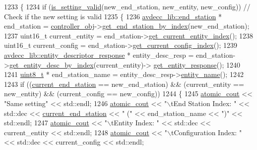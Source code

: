 \begin{DoxyCode}
1233 \{
1234     \textcolor{keywordflow}{if} (\hyperlink{classcmd__line_a52a88a9e3c1e1e6fea1865df944e3443}{is\_setting\_valid}(new\_end\_station, new\_entity, new\_config)) \textcolor{comment}{// Check if the new
       setting is valid}
1235     \{
1236         \hyperlink{classavdecc__lib_1_1end__station}{avdecc\_lib::end\_station} * end\_station = 
      \hyperlink{classcmd__line_af0a7784509e5bf1210a2aa19cea5df70}{controller\_obj}->\hyperlink{classavdecc__lib_1_1controller_a2a8ec1205ea0d5fdd6f833285257d0d0}{get\_end\_station\_by\_index}(new\_end\_station);
1237         uint16\_t current\_entity = end\_station->\hyperlink{classavdecc__lib_1_1end__station_aaf7e2defcfdf88c62c04fd88bd49787d}{get\_current\_entity\_index}();
1238         uint16\_t current\_config = end\_station->\hyperlink{classavdecc__lib_1_1end__station_abaf546b5bb641dcf161f895e3d6d8cd8}{get\_current\_config\_index}();
1239         \hyperlink{classavdecc__lib_1_1entity__descriptor__response}{avdecc\_lib::entity\_descriptor\_response} * entity\_desc\_resp = 
      end\_station->\hyperlink{classavdecc__lib_1_1end__station_a7456434346294f611e4d37255be4051b}{get\_entity\_desc\_by\_index}(current\_entity)->
      \hyperlink{classavdecc__lib_1_1entity__descriptor_ac31dd117f0c931ae93c8ba52df7211bd}{get\_entity\_response}();
1240 
1241         \hyperlink{stdint_8h_aba7bc1797add20fe3efdf37ced1182c5}{uint8\_t} * end\_station\_name = entity\_desc\_resp->\hyperlink{classavdecc__lib_1_1entity__descriptor__response_a3abd11ceacbf37b685377f2b73a502ca}{entity\_name}();
1242 
1243         \textcolor{keywordflow}{if} ((\hyperlink{classcmd__line_a67c43393f654ad7bc5c7caf29634cede}{current\_end\_station} == new\_end\_station) && (current\_entity == new\_entity) 
      && (current\_config == new\_config))
1244         \{
1245             \hyperlink{cmd__line_8h_a0bc38ccc65c79ba06c6fcd7b4bf554c3}{atomic\_cout} << \textcolor{stringliteral}{"Same setting"} << std::endl;
1246             \hyperlink{cmd__line_8h_a0bc38ccc65c79ba06c6fcd7b4bf554c3}{atomic\_cout} << \textcolor{stringliteral}{"\(\backslash\)tEnd Station Index: "} << std::dec << 
      \hyperlink{classcmd__line_a67c43393f654ad7bc5c7caf29634cede}{current\_end\_station} << \textcolor{stringliteral}{" ("} << end\_station\_name << \textcolor{stringliteral}{")"} << std::endl;
1247             \hyperlink{cmd__line_8h_a0bc38ccc65c79ba06c6fcd7b4bf554c3}{atomic\_cout} << \textcolor{stringliteral}{"\(\backslash\)tEntity Index: "} << std::dec << current\_entity << std::endl;
1248             \hyperlink{cmd__line_8h_a0bc38ccc65c79ba06c6fcd7b4bf554c3}{atomic\_cout} << \textcolor{stringliteral}{"\(\backslash\)tConfiguration Index: "} << std::dec << current\_config << std::endl;

\end{DoxyCode}
